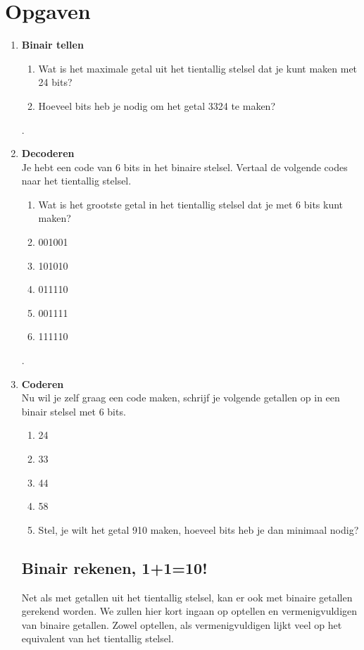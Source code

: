 \documentclass[10pt,a4paper,titlepage]{article}
\newcommand{\1}{\'{e}\'{e}n}
\begin{document}
\section*{Opgaven}
\begin{enumerate}
\item \textbf{Binair tellen}
\begin{enumerate}
\item Wat is het maximale getal uit het tientallig stelsel dat je kunt maken met 24 bits?
\item Hoeveel bits heb je nodig om het getal 3324 te maken?
\end{enumerate}
.
\item \textbf{Decoderen}\\
Je hebt een code van 6 bits in het binaire stelsel. Vertaal de volgende codes naar het tientallig stelsel.
\begin{enumerate}
\item{Wat is het grootste getal in het tientallig stelsel dat je met 6 bits kunt maken?} %
\item{001001} %
\item{101010} %
\item{011110} %
\item{001111} %
\item{111110}%
\end{enumerate}
.
\item \textbf{Coderen}\\
Nu wil je zelf graag een code maken, schrijf je volgende getallen op in een binair stelsel met 6 bits.
\begin{enumerate}
\item{24}%
\item{33}%
\item{44}%
\item{58}%
\item{Stel, je wilt het getal 910 maken, hoeveel bits heb je dan minimaal nodig?}%
\end{enumerate}

\newpage

\subsection*{Binair rekenen, 1+1=10!}
Net als met getallen uit het tientallig stelsel, kan er ook met binaire getallen gerekend worden. We zullen hier kort ingaan op optellen en vermenigvuldigen van binaire getallen. Zowel optellen, als vermenigvuldigen lijkt veel op het equivalent van het tientallig stelsel.\\


\end{enumerate}
\end{document}
